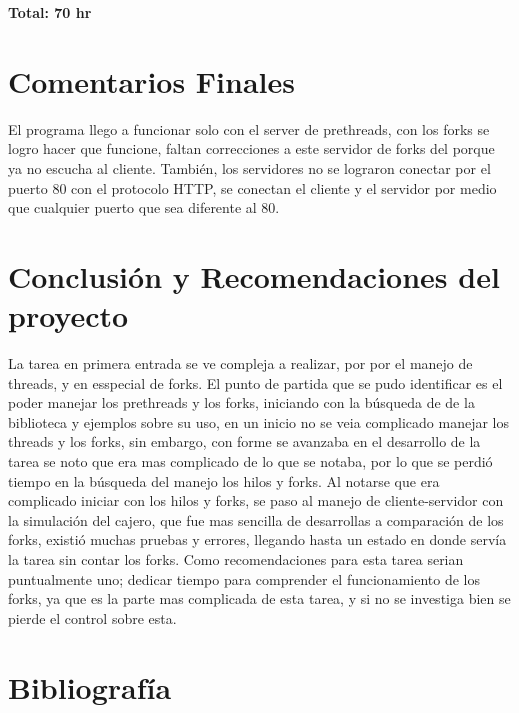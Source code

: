 \documentclass{article}
\begin{document}
\textbf{Total: 70 hr} \\[1ex]

\section{Comentarios Finales}
El programa llego a funcionar solo con el server de prethreads, con los forks se logro hacer que funcione, faltan correcciones a este servidor de forks del porque ya no escucha al cliente. También, los servidores no se lograron conectar por el puerto 80 con el protocolo HTTP, se conectan el cliente y el servidor por medio que cualquier puerto que sea diferente al 80.

\section{Conclusión y Recomendaciones del proyecto}
La tarea en primera entrada se ve compleja a realizar, por por el manejo de threads, y en esspecial de forks. El punto de partida que se pudo identificar es el poder manejar los prethreads y los forks, iniciando con la búsqueda de de la biblioteca y ejemplos sobre su uso, en un inicio no se veia complicado manejar los threads y los forks, sin embargo, con forme se avanzaba en el desarrollo de la tarea se noto que era mas complicado de lo que se notaba, por lo que se perdió tiempo en la búsqueda del manejo los hilos y forks.
Al notarse que era complicado iniciar con los hilos y forks, se paso al manejo de cliente-servidor con la simulación del cajero, que fue mas sencilla de desarrollas a comparación de los forks, existió muchas pruebas y errores, llegando hasta un estado en donde servía la tarea sin contar los forks.
Como recomendaciones para esta tarea serian puntualmente uno; dedicar tiempo para comprender el funcionamiento de los forks, ya que es la parte mas complicada de esta tarea, y si no se investiga bien se pierde el control sobre esta.


\section{Bibliografía}
\end{document}
